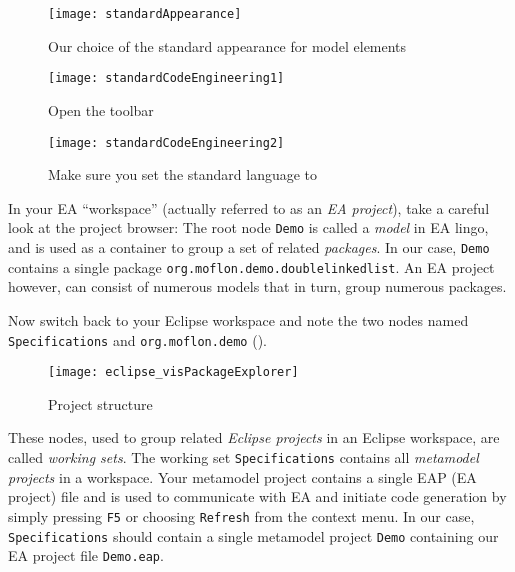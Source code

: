 \begin{figure}[htbp]
  \centering
  \texttt{[image: standardAppearance]}
  \caption{Our choice of the standard appearance for model elements}
  \label{ea:standardAppearanceEA}
\end{figure}

\begin{figure}[htbp]
    \centering
    \texttt{[image: standardCodeEngineering1]}
    \caption{Open the  toolbar}
    \label{ea:standardSCEEA1}
 \end{figure}

\begin{figure}[htbp]
    \centering
    \texttt{[image: standardCodeEngineering2]}
    \caption{Make sure you set the standard language to }
    \label{ea:standardSCEEA2}
 \end{figure}
 
\clearpage

In your EA \enquote{workspace} (actually referred to as an \emph{EA project}), take a careful look at the project browser:
The root node \texttt{Demo} is called a \emph{model} in EA lingo, and is used as a container to group a set of related \emph{packages}.
In our case, \texttt{Demo} contains a single package \texttt{org.moflon.demo.doublelinkedlist}.
An EA project however, can consist of numerous models that in turn, group numerous packages.

Now switch back to your Eclipse workspace and note the two nodes named \texttt{Specifications} and \texttt{org.moflon.demo} ().

\begin{figure}[htbp]
    \centering
    \texttt{[image: eclipse\_visPackageExplorer]}
    \caption{Project structure}
    \label{eclipse:eclipsePS}
 \end{figure}

These nodes, used to group related \emph{Eclipse projects} in an Eclipse workspace, are called \emph{working sets}. The working set
\texttt{Spe\-ci\-fi\-ca\-tions} contains all \emph{metamodel projects} in a  workspace. Your metamodel project contains a single EAP (EA project) file and is
used to communicate with EA and initiate code generation by simply pressing \texttt{F5} or choosing \texttt{Refresh} from the context menu. In our case,
\texttt{Specifications} should contain a single metamodel project \texttt{Demo} containing our EA project file  \texttt{Demo.eap}.
 
